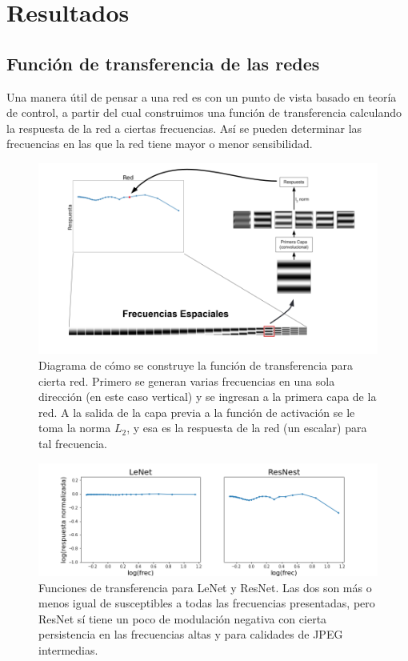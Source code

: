 \section{Resultados}

\subsection{Función de transferencia de las redes}

Una manera útil de pensar a una red es con un punto de vista basado en teoría de control, a partir del cual construimos una función de transferencia calculando la respuesta de la red a ciertas frecuencias. Así se pueden determinar las frecuencias en las que la red tiene mayor o menor sensibilidad.

\begin{figure}[h!]
    \centering
    \includegraphics[width=\textwidth, trim={0 2cm 0 0},clip]{images/bode_diagrams/explanation_bode.png}
    \caption{Diagrama de cómo se construye la función de transferencia para cierta red. Primero se generan varias frecuencias en una sola dirección (en este caso vertical) y se ingresan a la primera capa de la red. A la salida de la capa previa a la función de activación se le toma la norma $L_2$, y esa es la respuesta de la red (un escalar) para tal frecuencia.}
    \label{bode_explain}
\end{figure}

\begin{figure}[h!]
    \centering
    \includegraphics[width=\textwidth]{images/bode_diagrams/mnist_nets.png}
    \caption{Funciones de transferencia para LeNet y ResNet. Las dos son más o menos igual de susceptibles a todas las frecuencias presentadas, pero ResNet sí tiene un poco de modulación negativa con cierta persistencia en las frecuencias altas y para calidades de JPEG intermedias.}
    \label{bode_examples}
\end{figure}

